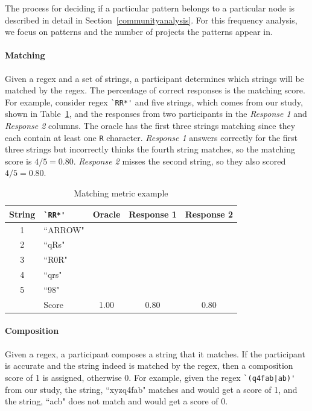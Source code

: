 The process for deciding if a particular pattern belongs to a particular node is described in detail in Section~\ref{communityanalysis}.
For this frequency analysis, we focus on patterns and the number of projects the patterns appear in.

\paragraph{Matching}
 Given a regex and a set of strings, a participant determines which strings will be matched by the regex. The percentage of correct responses is the matching score. For example, consider regex \verb!`RR*'! and five strings, which comes from our study, shown in Table~\ref{matchingmetric}, and the responses from two participants in the \emph{Response 1} and \emph{Response 2} columns. The oracle has the first three strings matching since they each contain at least one \verb!R! character. \emph{Response 1} answers correctly for the first three strings but incorrectly thinks the fourth string matches, so the matching score is $4/5 = 0.80$. \emph{Response 2} misses the second string, so they also scored $4/5 = 0.80$.


\begin{table}
\caption{Matching metric example \label{matchingmetric}}
\begin{center}
\begin{small}
\begin{tabular} {cl | c c c}
\textbf{String} & \verb!`RR*'! & \textbf{Oracle} & \textbf{Response 1} & \textbf{Response 2} \\ \hline
1 & ``ARROW" 	& \checkmark	& \checkmark	& \checkmark\\
2 & ``qRs" 		& \checkmark	& \checkmark	&\\
3 & ``R0R" 		& \checkmark 	& \checkmark 	& \checkmark\\
4 & ``qrs"		& 			& \checkmark 	&\\
5 & ``98"  		& 			&			&\\ \hline
& Score 		& 1.00		& 0.80		& 0.80 \\
\end{tabular}
\end{small}
\end{center}
\end{table}

\paragraph{Composition}
Given a regex, a participant composes a string that it matches. If the participant is accurate and the string indeed is matched by the regex, then a composition score of 1 is assigned, otherwise 0.  For example, given the regex \verb!`(q4fab|ab)'! from our study, the string, ``xyzq4fab" matches  and would get a score of 1, and the string, ``acb" does not match and would get a score of 0.

